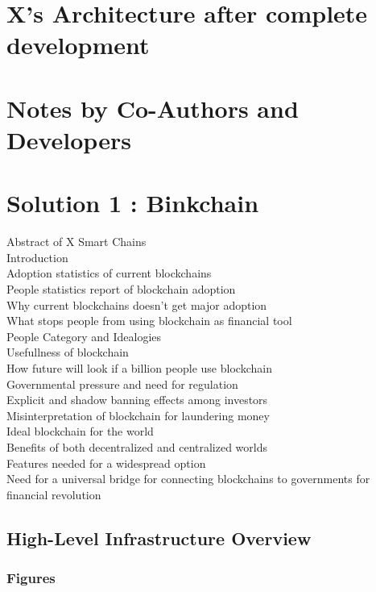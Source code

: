 \documentclass[letterpaper,11pt]{article}
\begin{document}
\section{X's Architecture after complete development}

\section{Notes by Co-Authors and Developers}

\section{Solution 1 : Binkchain}

Abstract of X Smart Chains\\
Introduction\\
Adoption statistics of current blockchains\\
People statistics report of blockchain adoption\\
Why current blockchains doesn't get major adoption\\
What stops people from using blockchain as financial tool\\
People Category and Idealogies\\
Usefullness of blockchain\\
How future will look if a billion people use blockchain\\
Governmental pressure and need for regulation\\
Explicit and shadow banning effects among investors\\
Misinterpretation of blockchain for laundering money\\
Ideal blockchain for the world\\
Benefits of both decentralized and centralized worlds\\
Features needed for a widespread option\\
Need for a universal bridge for connecting blockchains to governments for financial revolution\\

\subsection{High-Level Infrastructure Overview}


\subsubsection{Figures}
\end{document}
